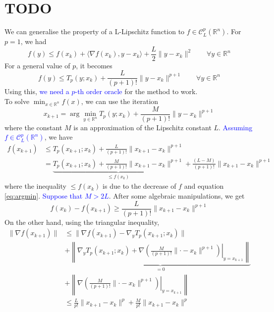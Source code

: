 \documentclass[12pt, openany]{report}
\newcommand{\R}{\mathbb{R}}
\newcommand{\C}{\mathcal{C}}
\theoremstyle{definition}
\begin{document}
\chapter{TODO}\label{chap:right_oracle}
We can generalise the property of a L-Lipschitz function to $f\in \C_L^p(\R^n)$. For $p=1$, we had 
\begin{equation}
	f(y)\le f(x_k) + \langle \nabla f(x_k),y-x_k\rangle + \frac{L}{2}\lVert y-x_k\rVert^2 \qquad \forall y\in \R^n 
\end{equation}
For a general value of $p$, it becomes 
\begin{equation}
	f(y) \le T_p(y;x_k) + \frac{L}{(p+1)!}\lVert y-x_k\rVert^{p+1} \qquad \forall y\in \R^n 
\end{equation}
Using this, \textcolor{blue}{we need a $p$-th order oracle} for the method to work. \\
To solve $\min_{x\in \R^n} f(x)$, we can use the iteration 
\begin{equation}\label{eq:argmin}
	x_{k+1} = \arg\min_{y\in \R^n} T_p(y;x_k)+\frac{M}{(p+1)!}\lVert y-x_k\rVert^{p+1}
\end{equation}
where the constant $M$ is an approximation of the Lipschitz constant $L$. \textcolor{blue}{Assuming $f\in \C^p_L(\R^n)$}, we have 
\begin{equation}
	\begin{aligned}
		f(x_{k+1}) &\le T_p(x_{k+1};x_k) + \frac{L}{(p+1)!}\lVert x_{k+1}-x_k\rVert^{p+1}\\
		&= \underbrace{T_p(x_{k+1};x_k) + \frac{M}{(p+1)!}\lVert x_{k+1}-x_k\rVert^{p+1}}_{\le f(x_k)} + \frac{(L-M)}{(p+1)!}\lVert x_{k+1}-x_k\rVert^{p+1}
	\end{aligned}
\end{equation}
where the inequality $\le f(x_k)$ is due to the decrease of $f$ and equation \eqref{eq:argmin}. 
\textcolor{blue}{Suppose that $M>2L$}. After some algebraic manipulations, we get
\begin{equation}\label{eq:bound}
	f(x_k)-f(x_{k+1}) \ge \frac{L}{(p+1)!}\lVert x_{k+1}-x_k\rVert^{p+1}
\end{equation}
On the other hand, using the triangular inequality, 
\begin{equation}
	\begin{aligned}
		\lVert \nabla f(x_{k+1})\rVert & \le \lVert \nabla f(x_{k+1})-\nabla_y T_p(x_{k+1};x_k)\lVert\\
		& + \underbrace{\left \lVert \nabla_y T_p(x_{k+1};x_k)+\nabla \left.\left(\frac{M}{(p+1)!} \lVert \cdot -x_k\rVert^{p+1}\right)\right|_{y=x_{k+1}}\right \rVert}_{=0}	\\
		& + \left\lVert \nabla \left.\left(\frac{M}{(p+1)!}\lVert \cdot -x_k\rVert^{p+1}\right)\right|_{y=x_{k+1}}\right \rVert \\
		& \le \frac{L}{p!}\lVert x_{k+1}-x_k\rVert^p + \frac{M}{p!} \lVert x_{k+1}-x_k\rVert^p
	\end{aligned}
\end{equation}
\end{document}
